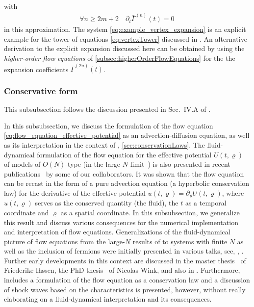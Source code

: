 with
\begin{align}
	\forall n \geq 2m+2 \quad \partial_t \bar{\Gamma}^{(n)}(t) = 0 \,
\end{align}
in this approximation.
The system \eqref{eq:example_vertex_expansion} is an explicit example for the tower of equations \nolinebreak[3]\eqref{eq:vertexTower} discussed in \veRef{}.
An alternative derivation to the explicit expansion discussed here can be obtained by using the \textit{higher-order flow equations} of \cref{subsec:higherOrderFlowEquations} for the 
the expansion coefficients $\bar{\Gamma}^{(2n)} ( t )$.

\subsubsection{Conservative form} \label{subsubsec:conservative_form}
\begin{disclaimer}
	This subsubsection follows the discussion presented in Sec.~IV.A of .
\end{disclaimer}
In this subsubsection, we discuss the formulation of the \frg{} flow equation \eqref{eq:flow_equation_effective_potential} as an advection-diffusion equation, as well as its interpretation in the context of \cfd{}, \cf{} \cref{sec:conservationLaws}. 
The fluid-dynamical formulation of the \frg{} flow equation for the effective potential $U ( t, \varrho )$ of models of $O(N)$-type (in the large-$N$ limit~\cite{Tetradis:1995br}) is also presented in recent publications~\cite{Grossi:2019urj,Grossi:2021ksl} by some of our collaborators.
It was shown that the \frg{} flow equation can be recast in the form of a pure advection equation (a hyperbolic conservation law) for the derivative of the effective potential $u ( t, \varrho ) = \partial_\varrho U ( t, \varrho )$, where $u ( t, \varrho )$ serves as the conserved quantity (the fluid), the \rgtime{} $t$ as a temporal coordinate and $\varrho$ as a spatial coordinate.
In this subsubsection, we generalize this result and discuss various consequences for the numerical implementation and interpretation of \frg{} flow equations.
Generalizations of the fluid-dynamical picture of \frg{} flow equations from the large-$N$ results of  to systems with finite $N$ as well as the inclusion of fermions were initially presented in various talks, see, \eg{}, .
Further early developments in this context are discussed in the master thesis~\cite{Ihssen2020} of Friederike Ihssen, the PhD thesis~\cite{Wink:2020tnu} of Nicolas Wink, and also in .
Furthermore,  includes a formulation of the flow equation as a conservation law and a discussion of shock waves based on the characteristics is presented, however, without really elaborating on a fluid-dynamical interpretation and its consequences.\bigskip

